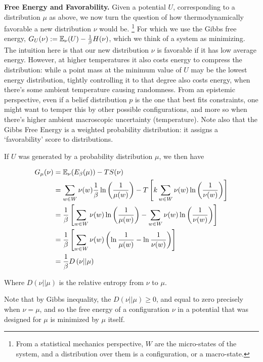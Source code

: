 {\textbf{Free Energy and Favorability.} Given a potential $U$, corresponding to a distribution $\mu$ as above, we now turn the question of how thermodynamically favorable a new distribution $\nu$ would be.%
	\footnote{From a statistical mechanics perspective, $W$ are the micro-states of the system, and a distribution over them is a configuration, or a macro-state.}
For which we use the Gibbs free energy, $G_U(\nu) := {\operatorname*{\mathbb{E}}}_\nu( U ) - \frac{1}{\beta} H(\nu)$, which we think of a system as minimizing. The intuition here is that our new distribution $\nu$ is favorable if it has low average energy. However, at higher temperatures it also costs energy to compress the distribution: while a point mass at the minimum value of $U$ may be the lowest energy distribution, tightly controlling it to that degree also costs energy, when there's some ambient temperature causing randomness. From an epistemic perspective, even if a belief distribution $p$  is the one that best fits constraints, one might want to temper this by other possible configurations, and more so when there's higher ambient macroscopic uncertainty (temperature). Note also that the Gibbs Free Energy is a weighted probability distribution: it assigns a `favorability' score to distributions.

If $U$ was generated by a probability distribution $\mu$, we then have

\begin{align*}
	G_\mu(\nu) &= {\operatorname*{\mathbb{E}}}_\nu( E_\beta(\mu) )  - T S(\nu) \\
	&= \sum_{w \in W}\nu(w) \frac{1}{\beta} \ln \left(\frac{1}{\mu(w)}\right) - T \left[k \sum_{w \in W} \nu(w) \ln \left(\frac{1}{\nu(w)}\right)\right]\\
	&=  \frac{1}{\beta}\left[\sum_{w \in W}\nu(w) \ln \left(\frac{1}{\mu(w)}\right) - \sum_{w \in W} \nu(w) \ln \left(\frac{1}{\nu(w)}\right)\right]\\
	&=  \frac{1}{\beta}\left[\sum_{w \in W}\nu(w) \left(\ln \frac{1}{\mu(w)} - \ln \frac{1}{\nu(w)}\right)\right]\\
	&= \frac{1}{\beta} D \left(\nu || \mu \right)
\end{align*}

Where $D(\nu || \mu)$ is the relative entropy from $\nu$ to $\mu$. 

Note that by Gibbs inequality, the $D(\nu || \mu) \geq 0$, and equal to zero precisely when $\nu = \mu$, and so the free energy of a configuration $\nu$ in a potential that was designed for $\mu$ is minimized by $\mu$ itself.	



}
